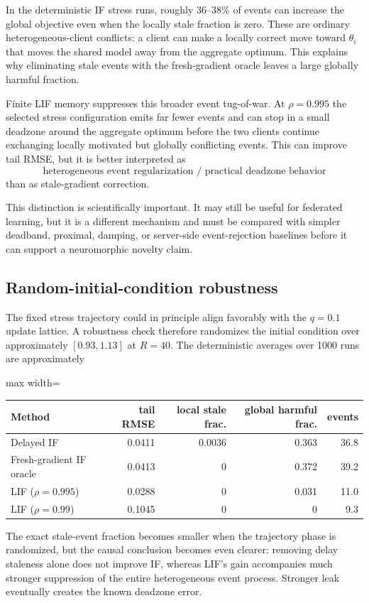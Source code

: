 In the deterministic IF stress runs, roughly $36$--$38\%$ of events can increase the global objective even when the locally stale fraction is zero. These are ordinary heterogeneous-client conflicts: a client can make a locally correct move toward $\theta_i$ that moves the shared model away from the aggregate optimum. This explains why eliminating stale events with the fresh-gradient oracle leaves a large globally harmful fraction.

Finite LIF memory suppresses this broader event tug-of-war. At $\rho=0.995$ the selected stress configuration emits far fewer events and can stop in a small deadzone around the aggregate optimum before the two clients continue exchanging locally motivated but globally conflicting events. This can improve tail RMSE, but it is better interpreted as
\begin{equation}
  \boxed{\text{heterogeneous event regularization / practical deadzone behavior}}
\end{equation}
than as stale-gradient correction.

This distinction is scientifically important. It may still be useful for federated learning, but it is a different mechanism and must be compared with simpler deadband, proximal, damping, or server-side event-rejection baselines before it can support a neuromorphic novelty claim.

\subsection{Random-initial-condition robustness}

The fixed stress trajectory could in principle align favorably with the $q=0.1$ update lattice. A robustness check therefore randomizes the initial condition over approximately $[0.93,1.13]$ at $R=40$. The deterministic averages over 1000 runs are approximately
\begin{center}
\begin{adjustbox}{max width=\textwidth}
\begin{tabular}{lrrrr}
\toprule
Method & tail RMSE & local stale frac. & global harmful frac. & events \\
\midrule
Delayed IF & 0.0411 & 0.0036 & 0.363 & 36.8 \\
Fresh-gradient IF oracle & 0.0413 & 0 & 0.372 & 39.2 \\
LIF ($\rho=0.995$) & 0.0288 & 0 & 0.031 & 11.0 \\
LIF ($\rho=0.99$) & 0.1045 & 0 & 0 & 9.3 \\
\bottomrule
\end{tabular}
\end{adjustbox}
\end{center}
The exact stale-event fraction becomes smaller when the trajectory phase is randomized, but the causal conclusion becomes even clearer: removing delay staleness alone does not improve IF, whereas LIF's gain accompanies much stronger suppression of the entire heterogeneous event process. Stronger leak eventually creates the known deadzone error.

